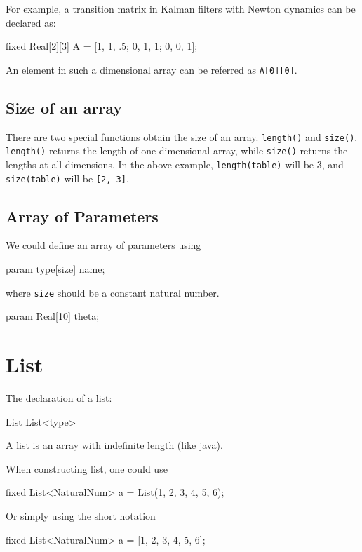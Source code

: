 \documentclass[12pt]{article}
\begin{document}
For example, a transition matrix in Kalman  filters with Newton dynamics can be declared as:
\begin{blog}
fixed Real[2][3] A = [1, 1, .5; 0, 1, 1; 0, 0, 1];
\end{blog}
An element in such a dimensional array can be referred as \texttt{A[0][0]}.


\subsection{Size of an array}
There are two special functions obtain the size of an array.
\texttt{length(\mycdot)} and \texttt{size(\mycdot)}.
\texttt{length(\mycdot)} returns the length of one dimensional array, while \texttt{size(\mycdot)} returns the lengths at all dimensions.
In the above example, \texttt{length(table)} will be 3, and \texttt{size(table)} will be \texttt{[2, 3]}.


\subsection {Array of Parameters}
We could define an array of parameters using
\begin{blog}
param type[size] name;
\end{blog}
where {\tt size} should be a constant natural number.

\begin{blog}
param Real[10] theta;
\end{blog}



\section{List}
The declaration of a list:
\begin{blog}
List 
List<type> 
\end{blog}
A list is an array with indefinite length (like java).

When constructing list, one could use 
\begin{blog}
fixed List<NaturalNum> a = List(1, 2, 3, 4, 5, 6);
\end{blog}
Or simply using the short notation
\begin{blog}
fixed List<NaturalNum> a = [1, 2, 3, 4, 5, 6];
\end{blog}
\end{document}
